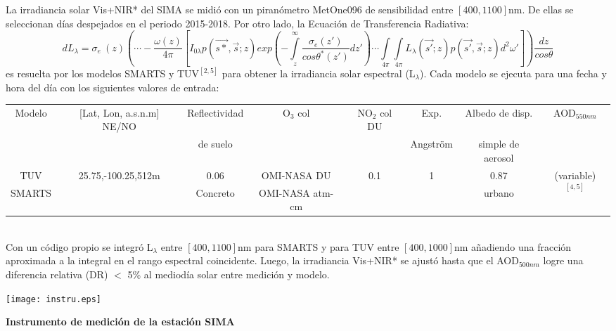 \documentclass{article}
\begin{document}
\begin{minipage}{0.81\linewidth}
La irradiancia solar Vis+NIR* del SIMA se midió con un piranómetro MetOne096 de sensibilidad entre $\left[400,1100\right]$nm. De ellas se seleccionan días despejados en el periodo 2015-2018. Por otro lado, la Ecuación de Transferencia Radiativa:
\begin{equation*}
dL_{\lambda}=\sigma_e \ \left(z\right) \left(\cdots - \frac{\omega\left(z\right)}{4\pi} \left[I_{0\lambda}p\left(\vec{s*},\vec{s};z \right)exp\left(-\int\limits_z^\infty \frac{\sigma_e(z')}{cos\theta^*(z')}dz' \right)\cdots \int\limits_{4\pi}\int\limits_{4\pi} L_{\lambda}(\vec{s'};z)p(\vec{s'},\vec{s};z)d^2\omega' \right]\right)\frac{dz}{cos\theta}
\end{equation*}
es resuelta por los modelos SMARTS y TUV$^{\left[2,5\right]}$ para obtener la irradiancia solar espectral (L$_\lambda$). Cada modelo se ejecuta para una fecha y hora del día con los siguientes valores de entrada: 

\changefontsizes{9.5pt}
\begin{tabular}{|c|c|c|c|c|c|c|c|}
\hline
  Modelo & [Lat, Lon, a.s.n.m] NE/NO & Reflectividad  & O$_3$ col & NO$_2$ col DU & Exp. & Albedo de disp. & AOD$_{550nm}$ \\
  & & de suelo & & &Angström & simple de aerosol & \\ \hline
 TUV  & \multirow{2}{*}{25.75,-100.25,512m}& 0.06 & OMI-NASA DU & \multirow{2}{*}{0.1} & \multirow{2}{*}{1} & 0.87 & \multirow{2}{*}{(variable)$^{\left[4,5 \right]}$}\\ \cline{1-1}
SMARTS & & Concreto & OMI-NASA atm-cm &  &  & urbano & \\ \hline
\end{tabular}\vspace{0.2cm}\\
\changefontsizes{12pt}
Con un código propio se integró L$_\lambda$ entre $\left[400,1100\right]$nm para SMARTS y para TUV entre $\left[400,1000\right]$nm añadiendo una fracción aproximada a la integral en el rango espectral coincidente. Luego, la irradiancia Vis+NIR* se ajustó hasta que el AOD$_{500nm}$ logre una diferencia relativa (DR) $<$ 5\% al mediodía solar entre medición y modelo.
\end{minipage}
\hspace{0.3cm}
\begin{minipage}{0.18\linewidth}
\texttt{[image: instru.eps]}
\begin{center}
\textbf{\textcolor{ver}{Instrumento de medición de la estación SIMA}}
\end{center}
\end{minipage}
\end{document}

